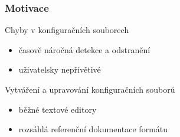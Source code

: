 \begin{frame}[t]
	\frametitle{Motivace}
	\begin{block}{Chyby v konfiguračních souborech}
	\begin{itemize}[<+->]
		\item časově náročná detekce a odstranění
		\item uživatelsky nepřívětivé
	\end{itemize}
	\end{block}
	
	\begin{block}{Vytváření a upravování konfiguračních souborů}
	\begin{itemize}[<+->]
		\item běžné textové editory
		\item rozsáhlá referenční dokumentace formátu
	\end{itemize}
	\end{block}
	
\end{frame}

